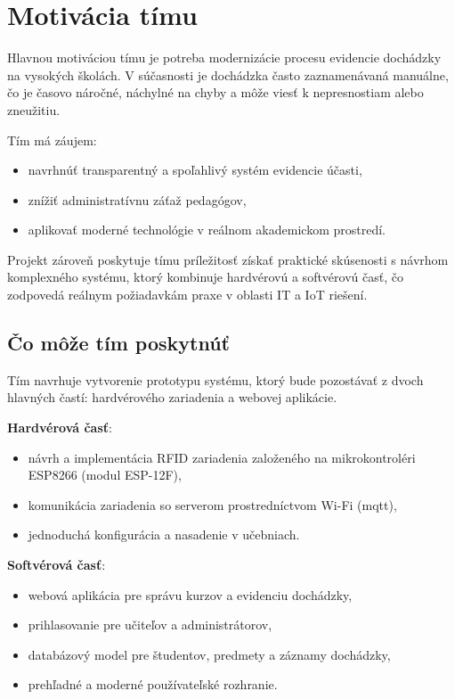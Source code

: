 \section{Motivácia tímu}

Hlavnou motiváciou tímu je potreba modernizácie procesu evidencie dochádzky na vysokých školách.
V súčasnosti je dochádzka často zaznamenávaná manuálne, čo je časovo náročné, náchylné na chyby
a môže viesť k nepresnostiam alebo zneužitiu.

Tím má záujem:
\begin{itemize}
    \item navrhnúť transparentný a spoľahlivý systém evidencie účasti,
    \item znížiť administratívnu záťaž pedagógov,
    \item aplikovať moderné technológie v reálnom akademickom prostredí.
\end{itemize}

Projekt zároveň poskytuje tímu príležitosť získať praktické skúsenosti s návrhom komplexného
systému, ktorý kombinuje hardvérovú a softvérovú časť, čo zodpovedá reálnym požiadavkám
praxe v oblasti IT a IoT riešení.

\subsection{Čo môže tím poskytnúť}

Tím navrhuje vytvorenie prototypu systému, ktorý bude pozostávať z dvoch hlavných častí:
hardvérového zariadenia a webovej aplikácie.

\textbf{Hardvérová časť}:
\begin{itemize}
    \item návrh a implementácia RFID zariadenia založeného na mikrokontroléri ESP8266 (modul ESP-12F),
    \item komunikácia zariadenia so serverom prostredníctvom Wi-Fi (mqtt),
    \item jednoduchá konfigurácia a nasadenie v učebniach.
\end{itemize}

\textbf{Softvérová časť}:
\begin{itemize}
    \item webová aplikácia pre správu kurzov a evidenciu dochádzky,
    \item prihlasovanie pre učiteľov a administrátorov,
    \item databázový model pre študentov, predmety a záznamy dochádzky,
    \item prehľadné a moderné používateľské rozhranie.
\end{itemize}

